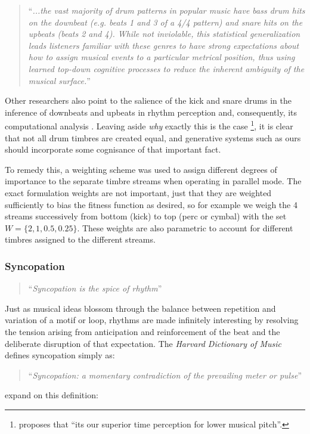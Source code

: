 {{{\blockcquote[]{Merchant2015}{``\textit{...the vast majority of drum patterns in popular music have bass drum hits on the downbeat (e.g. beats 1 and 3 of a 4/4 pattern) and snare hits on the upbeats (beats 2 and 4). While not inviolable, this statistical generalization leads listeners familiar with these genres to have strong expectations about how to assign musical events to a particular metrical position, thus using learned top-down cognitive processes to reduce the inherent ambiguity of the musical surface.}''}

Other researchers also point to the salience of the kick and snare drums in the inference of downbeats and upbeats in rhythm perception and, consequently, its computational analysis \citep{Zils2002, Panteli2014a, Gomez-Marin2017}. Leaving aside \textit{why} exactly this is the case \footnote{\cite{Hove2014} proposes that ``its our superior time perception for lower musical pitch''.}, it is clear that not all drum timbres are created equal, and generative systems such as ours should incorporate some cognisance of that important fact.

To remedy this, a weighting scheme was used to assign different degrees of importance to the separate timbre streams when operating in parallel mode. The exact formulation weights are not important, just that they are weighted sufficiently to bias the fitness function as desired, so for example we weigh the 4 streams successively from bottom (kick) to top (perc or cymbal) with  the set $W = \{2, 1, 0.5, 0.25\}$. These weights are also parametric to account for different timbres assigned to the different streams.

\subsubsection{Syncopation}

\blockcquote[]{Toussaint2013}{``\textit{Syncopation is the spice of rhythm}''}

Just as musical ideas blossom through the balance between repetition and variation of a motif or loop, rhythms are made infinitely interesting by resolving the tension arising from anticipation and reinforcement of the beat and the deliberate disruption of that expectation. The \textit{Harvard Dictionary of Music} defines syncopation simply as:

\blockcquote[]{Apel1969}{``\textit{Syncopation: a momentary contradiction of the prevailing meter or pulse}''}

\cite{Gomez2005} expand on this definition:

}}}
